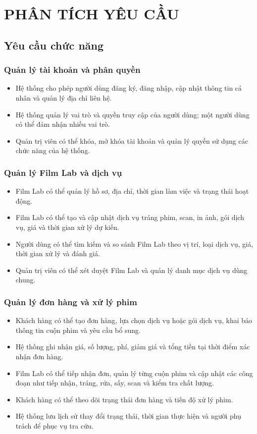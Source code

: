 \chapter{PHÂN TÍCH YÊU CẦU}

\section{Yêu cầu chức năng}

\subsection{Quản lý tài khoản và phân quyền}
\begin{itemize}
    \item Hệ thống cho phép người dùng đăng ký, đăng nhập, cập nhật thông tin cá nhân và quản lý địa chỉ liên hệ.
    \item Hệ thống quản lý vai trò và quyền truy cập của người dùng; một người dùng có thể đảm nhận nhiều vai trò.
    \item Quản trị viên có thể khóa, mở khóa tài khoản và quản lý quyền sử dụng các chức năng của hệ thống.
\end{itemize}

\subsection{Quản lý Film Lab và dịch vụ}
\begin{itemize}
    \item Film Lab có thể quản lý hồ sơ, địa chỉ, thời gian làm việc và trạng thái hoạt động.
    \item Film Lab có thể tạo và cập nhật dịch vụ tráng phim, scan, in ảnh, gói dịch vụ, giá và thời gian xử lý dự kiến.
    \item Người dùng có thể tìm kiếm và so sánh Film Lab theo vị trí, loại dịch vụ, giá, thời gian xử lý và đánh giá.
    \item Quản trị viên có thể xét duyệt Film Lab và quản lý danh mục dịch vụ dùng chung.
\end{itemize}

\subsection{Quản lý đơn hàng và xử lý phim}
\begin{itemize}
    \item Khách hàng có thể tạo đơn hàng, lựa chọn dịch vụ hoặc gói dịch vụ, khai báo thông tin cuộn phim và yêu cầu bổ sung.
    \item Hệ thống ghi nhận giá, số lượng, phí, giảm giá và tổng tiền tại thời điểm xác nhận đơn hàng.
    \item Film Lab có thể tiếp nhận đơn, quản lý từng cuộn phim và cập nhật các công đoạn như tiếp nhận, tráng, rửa, sấy, scan và kiểm tra chất lượng.
    \item Khách hàng có thể theo dõi trạng thái đơn hàng và tiến độ xử lý phim.
    \item Hệ thống lưu lịch sử thay đổi trạng thái, thời gian thực hiện và người phụ trách để phục vụ tra cứu.
\end{itemize}

